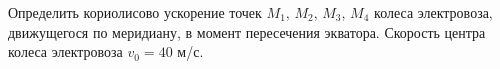Определить кориолисово ускорение точек $M_1$, $M_2$, $M_3$, $M_4$ колеса
электровоза, движущегося по меридиану, в момент пересечения экватора.
Скорость центра колеса электровоза $v_0=40$ м/с.
